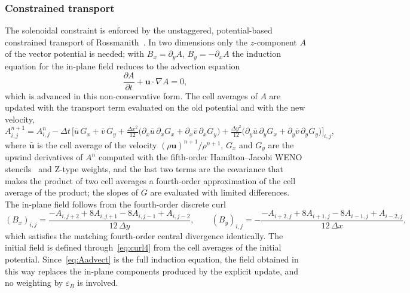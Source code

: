 \documentclass[a4paper,fleqn]{cas-sc}
\theoremstyle{remark}
\newcommand{\eps}{\varepsilon}
\newcommand{\epsB}{\eps_{B}}
\begin{document}
\subsubsection{Constrained transport}
\label{sec:CT}
The solenoidal constraint is enforced by the unstaggered, potential-based
constrained transport of Rossmanith~\cite{Rossmanith2006}. In two dimensions only
the $z$-component $A$ of the vector potential is needed; with
$B_x=\partial_yA$, $B_y=-\partial_xA$ the induction equation for the in-plane
field reduces to the advection equation
\begin{equation}
\label{eq:Aadvect}
\frac{\partial A}{\partial t}+\mathbf{u}\cdot\nabla A=0 ,
\end{equation}
which is advanced in this non-conservative form. The cell averages of $A$ are
updated with the transport term evaluated on the old potential and with the new
velocity,
\begin{equation}
\label{eq:Aupdate}
A^{n+1}_{i,j}=A^{n}_{i,j}-\Delta t\,\Big[\bar u\,G_x+\bar v\,G_y
+\tfrac{\Delta x^{2}}{12}\big(\partial_x\bar u\,\partial_xG_x+\partial_x\bar v\,\partial_xG_y\big)
+\tfrac{\Delta y^{2}}{12}\big(\partial_y\bar u\,\partial_yG_x+\partial_y\bar v\,\partial_yG_y\big)\Big]_{i,j},
\end{equation}
where $\bar{\mathbf{u}}$ is the cell average of the velocity
$(\rho\mathbf{u})^{n+1}/\rho^{n+1}$, $G_x$ and $G_y$ are the upwind derivatives of
$A^{n}$ computed with the fifth-order Hamilton--Jacobi WENO
stencils~\cite{JiangPeng2000} and Z-type weights, and the last two terms are the
covariance that makes the product of two cell averages a fourth-order
approximation of the cell average of the product; the slopes of $G$ are evaluated with
limited differences. The in-plane field follows from the fourth-order discrete
curl
\begin{equation}
\label{eq:curl4}
(B_x)_{i,j}=\frac{-A_{i,j+2}+8A_{i,j+1}-8A_{i,j-1}+A_{i,j-2}}{12\,\Delta y},
\qquad
(B_y)_{i,j}=-\frac{-A_{i+2,j}+8A_{i+1,j}-8A_{i-1,j}+A_{i-2,j}}{12\,\Delta x},
\end{equation}
which satisfies the matching fourth-order central divergence identically. The
initial field is defined through~\eqref{eq:curl4} from the cell averages of the
initial potential. Since~\eqref{eq:Aadvect} is the full induction equation, the
field obtained in this way replaces the in-plane components produced by the
explicit update, and no weighting by $\epsB$ is involved.
\end{document}

